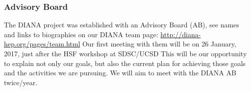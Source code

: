 \begin{frame}
\frametitle{Advisory Board}

The DIANA project was established with an Advisory Board (AB), see names and links to biographies on our DIANA team page:
\vskip 0.15in
\url{http://diana-hep.org/pages/team.html}
\vskip 0.15in
Our first meeting with them will be on 26 January, 2017, just after the HSF workshop at SDSC/UCSD
\vskip 0.15in
This will be our opportunity to explain not only our goals, but also the current plan for achieving those goals and the activities we are pursuing.
\vskip 0.15in
We will aim to meet with the DIANA AB twice/year.

\end{frame}


